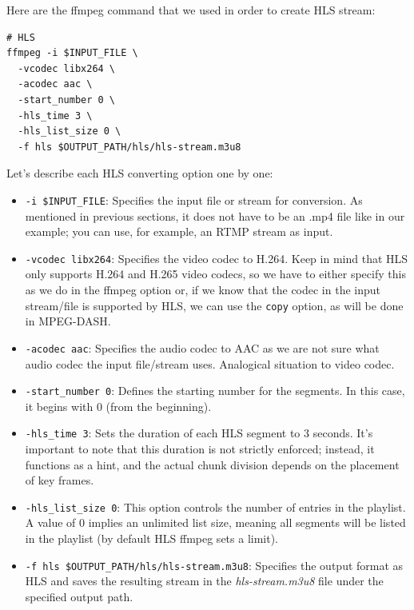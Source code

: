 \documentclass{article}
\begin{document}
Here are the ffmpeg command that we used in order to create HLS stream:

\begin{verbatim}
# HLS
ffmpeg -i $INPUT_FILE \
  -vcodec libx264 \
  -acodec aac \
  -start_number 0 \
  -hls_time 3 \
  -hls_list_size 0 \
  -f hls $OUTPUT_PATH/hls/hls-stream.m3u8
\end{verbatim}

Let's describe each HLS converting option one by one:

\begin{itemize}
    \item \texttt{-i \$INPUT\_FILE}: Specifies the input file or stream for conversion. As mentioned in previous sections, it does not have to be an .mp4 file like in our example; you can use, for example, an RTMP stream as input.
    
    \item \texttt{-vcodec libx264}: Specifies the video codec to H.264. Keep in mind that HLS only supports H.264 and H.265 video codecs, so we have to either specify this as we do in the ffmpeg option or, if we know that the codec in the input stream/file is supported by HLS, we can use the \texttt{copy} option, as will be done in MPEG-DASH.
    
    \item \texttt{-acodec aac}: Specifies the audio codec to AAC as we are not sure what audio codec the input file/stream uses. Analogical situation to video codec.
    
    \item \texttt{-start\_number 0}: Defines the starting number for the segments. In this case, it begins with 0 (from the beginning).
    
    \item \texttt{-hls\_time 3}: Sets the duration of each HLS segment to 3 seconds. It's important to note that this duration is not strictly enforced; instead, it functions as a hint, and the actual chunk division depends on the placement of key frames.
    
    \item \texttt{-hls\_list\_size 0}: This option controls the number of entries in the playlist. A value of 0 implies an unlimited list size, meaning all segments will be listed in the playlist (by default HLS ffmpeg sets a limit).
    
    \item \texttt{-f hls \$OUTPUT\_PATH/hls/hls-stream.m3u8}: Specifies the output format as HLS and saves the resulting stream in the \emph{hls-stream.m3u8} file under the specified output path.
\end{itemize}
\end{document}
